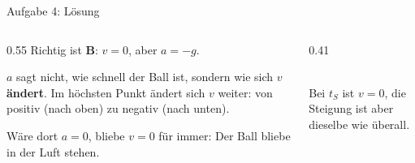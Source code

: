 \documentclass[14pt,aspectratio=169]{beamer}
\begin{document}
\begin{frame}{Aufgabe 4: Lösung}
  \begin{columns}[T]
    \begin{column}{0.55\textwidth}
      \small
      Richtig ist \textbf{B}: $v=0$, aber $a=-g$.

      \vspace{0.3em}
      $a$ sagt nicht, wie schnell der Ball ist, sondern wie sich $v$
      \textbf{ändert}. Im höchsten Punkt ändert sich $v$ weiter: von
      positiv (nach oben) zu negativ (nach unten).

      \vspace{0.3em}
      Wäre dort $a=0$, bliebe $v=0$ für immer: Der Ball bliebe in der Luft
      stehen.
    \end{column}
    \begin{column}{0.41\textwidth}
      \centering
      \\[0.2em]
      \footnotesize Bei $t_S$ ist $v=0$, die Steigung ist aber dieselbe
      wie überall.
    \end{column}
  \end{columns}
\end{frame}
\end{document}
